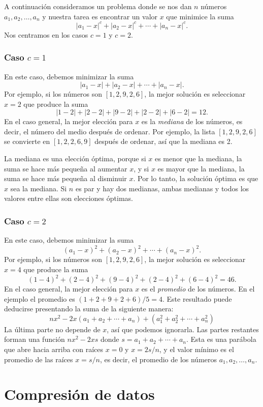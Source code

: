 A continuación consideramos un problema donde
se nos dan $n$ números $a_1,a_2,\ldots,a_n$
y nuestra tarea es encontrar un valor $x$
que minimice la suma
\[|a_1-x|^c+|a_2-x|^c+\cdots+|a_n-x|^c.\]
Nos centramos en los casos $c=1$ y $c=2$.

\subsubsection{Caso $c=1$}

En este caso, debemos minimizar la suma
\[|a_1-x|+|a_2-x|+\cdots+|a_n-x|.\]
Por ejemplo, si los números son $[1,2,9,2,6]$,
la mejor solución es seleccionar $x=2$
que produce la suma
\[
|1-2|+|2-2|+|9-2|+|2-2|+|6-2|=12.
\]
En el caso general, la mejor elección para $x$
es la \textit{mediana} de los números,
es decir, el número del medio después de ordenar.
Por ejemplo, la lista $[1,2,9,2,6]$
se convierte en $[1,2,2,6,9]$ después de ordenar,
así que la mediana es 2.

La mediana es una elección óptima,
porque si $x$ es menor que la mediana,
la suma se hace más pequeña al aumentar $x$,
y si $x$ es mayor que la mediana,
la suma se hace más pequeña al disminuir $x$.
Por lo tanto, la solución óptima es que $x$
sea la mediana.
Si $n$ es par y hay dos medianas,
ambas medianas y todos los valores entre ellas
son elecciones óptimas.

\subsubsection{Caso $c=2$}

En este caso, debemos minimizar la suma
\[(a_1-x)^2+(a_2-x)^2+\cdots+(a_n-x)^2.\]
Por ejemplo, si los números son $[1,2,9,2,6]$,
la mejor solución es seleccionar $x=4$
que produce la suma
\[
(1-4)^2+(2-4)^2+(9-4)^2+(2-4)^2+(6-4)^2=46.
\]
En el caso general, la mejor elección para $x$
es el \emph{promedio} de los números.
En el ejemplo el promedio es $(1+2+9+2+6)/5=4$.
Este resultado puede deducirse presentando
la suma de la siguiente manera:
\[
nx^2 - 2x(a_1+a_2+\cdots+a_n) + (a_1^2+a_2^2+\cdots+a_n^2)
\]
La última parte no depende de $x$,
así que podemos ignorarla.
Las partes restantes forman una función
$nx^2-2xs$ donde $s=a_1+a_2+\cdots+a_n$.
Esta es una parábola que abre hacia arriba
con raíces $x=0$ y $x=2s/n$,
y el valor mínimo es el promedio
de las raíces $x=s/n$, es decir,
el promedio de los números $a_1,a_2,\ldots,a_n$.

\section{Compresión de datos}

